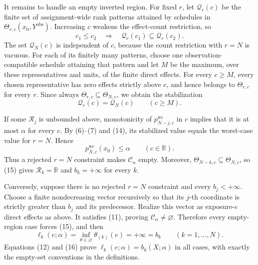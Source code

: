 It remains to handle an empty inverted region.  For fixed \(r\), let \(\mathcal Q_r(c)\) be the finite set of assignment-wide rank patterns attained by schedules in \(\Theta_{r,c}(x_0,Y^{\mathrm{obs}})\).  Increasing \(c\) weakens the effect-count restriction, so
\[
 c_1\leq c_2\quad\Longrightarrow\quad
 \mathcal Q_r(c_1)\subseteq\mathcal Q_r(c_2).
\tag{13}
\]
The set \(\mathcal Q_N(c)\) is independent of \(c\), because the count restriction with \(r=N\) is vacuous.  For each of its finitely many patterns, choose one observation-compatible schedule attaining that pattern and let \(M\) be the maximum, over these representatives and units, of the finite direct effects.  For every \(c\geq M\), every chosen representative has zero effects strictly above \(c\), and hence belongs to \(\Theta_{r,c}\) for every \(r\).  Since always \(\Theta_{r,c}\subseteq\Theta_{N,c}\), we obtain the stabilization
\[
 \mathcal Q_r(c)=\mathcal Q_N(c)
 \qquad(c\geq M).
\tag{14}
\]

If some \(\mathcal R_j\) is unbounded above, monotonicity of \(p^{\mathrm{wc}}_{N-j,c}\) in \(c\) implies that it is at most \(\alpha\) for every \(c\).  By (6)--(7) and (14), its stabilized value equals the worst-case value for \(r=N\).  Hence
\[
 p^{\mathrm{wc}}_{N,c}(x_0)\leq\alpha
 \qquad(c\in\mathbb R).
\tag{15}
\]
Thus a rejected \(r=N\) constraint makes \(\mathcal C_\alpha\) empty.  Moreover, \(\Theta_{N-k,c}\subseteq\Theta_{N,c}\), so (15) gives \(\mathcal R_k=\mathbb R\) and \(b_k=+\infty\) for every \(k\).

Conversely, suppose there is no rejected \(r=N\) constraint and every \(b_j<+\infty\).  Choose a finite nondecreasing vector recursively so that its \(j\)-th coordinate is strictly greater than \(b_j\) and its predecessor.  Realize this vector as exposure-\(e\) direct effects as above.  It satisfies (11), proving \(\mathcal C_\alpha\neq\varnothing\).  Therefore every empty-region case forces (15), and then
\[
 \ell_k(e;\alpha)
 =\inf_{\theta\in\varnothing}\theta_{(k)}(e)
 =+\infty=b_k
 \qquad(k=1,\ldots,N).
\tag{16}
\]
Equations (12) and (16) prove \(\ell_k(e;\alpha)=b_k(X;\alpha)\) in all cases, with exactly the empty-set conventions in the definitions.

